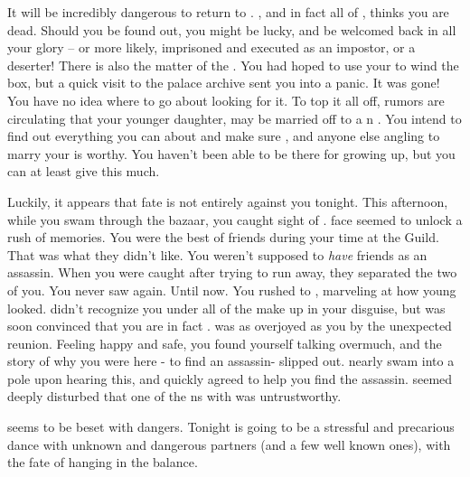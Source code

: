 \documentclass[char]{NeptuneBall}
\begin{document}
It will be incredibly dangerous to return to \pAtlantis{}. \cKing{}, and in fact all of \pAtlantis{}, thinks you are dead. Should you be found out, you might be lucky, and be welcomed back in all your glory -- or more likely, imprisoned and executed as an impostor, or a deserter! There is also the matter of the \iMusicBox{\MYname}. You had hoped to use your \iMusicBoxKey{} to wind the box, but a quick visit to the palace archive sent you into a panic. It was gone! You have no idea where to go about looking for it. To top it all off, rumors are circulating that your younger daughter, \cPrincess{} may be married off to a \pPacifica{}n \cPrince{\prince}. You intend to find out everything you can about \cPrince{\them} and make sure \cPrince{\they}, and anyone else angling to marry your \cPrincess{\offspring} is worthy. You haven't been able to be there for \cPrincess{} growing up, but you can at least give \cPrincess{\them} this much.

Luckily, it appears that fate is not entirely against you tonight. This afternoon, while you swam through the bazaar, you caught sight of \cDiplomat{}. \cDiplomat{\Their} face seemed to unlock a rush of memories. You were the best of friends during your time at the Guild.  That was what they didn't like. You weren't supposed to \emph{have} friends as an assassin.  When you were caught after trying to run away, they separated the two of you. You never saw \cDiplomat{\them} again. Until now. You rushed to \cDiplomat{\them}, marveling at how young \cDiplomat{\they} looked. \cDiplomat{} didn't recognize you under all of the make up in your disguise, but was soon convinced that you are in fact \cQueen{}. \cDiplomat{\They} was as overjoyed as you by the unexpected reunion. Feeling happy and safe, you found yourself talking overmuch, and the story of why you were here - to find an assassin- slipped out. \cDiplomat{} nearly swam into a pole upon hearing this, and quickly agreed to help you find the assassin. \cDiplomat{\They} seemed deeply disturbed that one of the \pPacifica{}ns with \cDiplomat{\them} was untrustworthy.

\pAtlantis{} seems to be beset with dangers. Tonight is going to be a stressful and precarious dance with unknown and dangerous partners (and a few well known ones), with the fate of \pAtlantis{} hanging in the balance.
\end{document}
